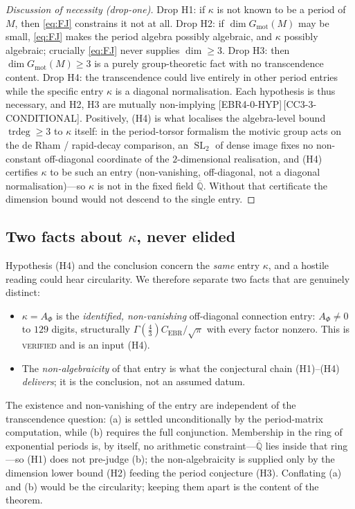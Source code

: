 \documentclass[11pt,reqno]{amsart}
\theoremstyle{plain}
\theoremstyle{definition}
\theoremstyle{remark}
\newcommand{\Q}{\mathbb{Q}}
\newcommand{\Qbar}{\overline{\Q}}
\newcommand{\Gmot}{G_{\mathrm{mot}}}
\newcommand{\SL}{\operatorname{SL}}
\newcommand{\trdeg}{\operatorname{trdeg}}
\newcommand{\Cebr}{C_{\mathrm{EBR}}}
\newcommand{\claim}[1]{\textsf{\small[#1]}}
\begin{document}
\begin{proof}[Discussion of necessity (drop-one)]
Drop H1: if $\kappa$ is not known to be a period of $M$, then \eqref{eq:FJ}
constrains it not at all. Drop H2: if $\dim\Gmot(M)$ may be small, \eqref{eq:FJ}
makes the period algebra possibly algebraic, and $\kappa$ possibly algebraic;
crucially \eqref{eq:FJ} never supplies $\dim\ge3$. Drop H3: then
$\dim\Gmot(M)\ge3$ is a purely group-theoretic fact with no transcendence
content. Drop H4: the transcendence could live entirely in other period
entries while the specific entry $\kappa$ is a diagonal normalisation. Each
hypothesis is thus necessary, and H2, H3 are mutually non-implying
\claim{EBR4-0-HYP}\,\claim{CC3-3-CONDITIONAL}. Positively, (H4) is what
localises the algebra-level bound $\trdeg\ge3$ to $\kappa$ itself: in the
period-torsor formalism the motivic group acts on the de Rham / rapid-decay
comparison, an $\SL_{2}$ of dense image fixes no non-constant off-diagonal
coordinate of the $2$-dimensional realisation, and (H4) certifies $\kappa$ to be
such an entry (non-vanishing, off-diagonal, not a diagonal normalisation)---so
$\kappa$ is not in the fixed field $\Qbar$. Without that certificate the
dimension bound would not descend to the single entry.
\end{proof}

\subsection{Two facts about $\kappa$, never elided}\label{sec:twofacts}
Hypothesis (H4) and the conclusion concern the \emph{same} entry $\kappa$, and a
hostile reading could hear circularity. We therefore separate two facts that are
genuinely distinct:
\begin{itemize}
\item[(a)] $\kappa=A_{\Phi}$ is the \emph{identified, non-vanishing}
off-diagonal connection entry: $A_{\Phi}\neq0$ to $129$ digits, structurally
$\Gamma(\tfrac43)\Cebr/\sqrt\pi$ with every factor nonzero. This is
\textsc{verified} and is an input (H4).
\item[(b)] The \emph{non-algebraicity} of that entry is what the conjectural
chain (H1)--(H4) \emph{delivers}; it is the conclusion, not an assumed datum.
\end{itemize}
The existence and non-vanishing of the entry are independent of the
transcendence question: (a) is settled unconditionally by the period-matrix
computation, while (b) requires the full conjunction. Membership in the ring of
exponential periods is, by itself, no arithmetic constraint---$\Qbar$ lies
inside that ring---so (H1) does not pre-judge (b); the non-algebraicity is
supplied only by the dimension lower bound (H2) feeding the period conjecture
(H3). Conflating (a) and (b) would be the circularity; keeping them apart is the
content of the theorem.
\end{document}
